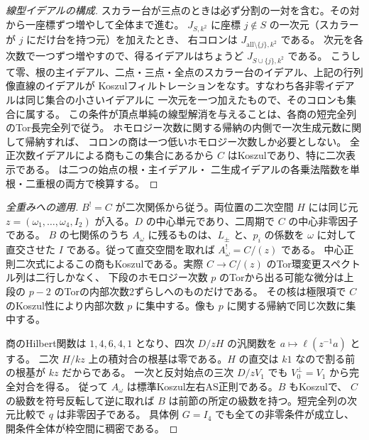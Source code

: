 \begin{proof}[線型イデアルの構成]
スカラー台が三点のときは必ず分割の一対を含む。その対から一座標ずつ増やして全体まで進む。
$J_{S,k^2}$ に座標 $j\notin S$ の一次元（スカラーが $j$ にだけ台を持つ元）を加えたとき、
右コロンは $J_{\mathrm{all}\setminus\{j\},k^2}$ である。
次元を各次数で一つずつ増やすので、得るイデアルはちょうど $J_{S\cup\{j\},k^2}$ である。
こうして零、根の主イデアル、二点・三点・全点のスカラー台のイデアル、上記の行列像直線のイデアルが
Koszulフィルトレーションをなす。すなわち各非零イデアルは同じ集合の小さいイデアルに
一次元を一つ加えたもので、そのコロンも集合に属する。
この条件が頂点単純の線型解消を与えることは、各商の短完全列のTor長完全列で従う。
ホモロジー次数に関する帰納の内側で一次生成元数に関して帰納すれば、
コロンの商は一つ低いホモロジー次数しか必要としない。
全正次数イデアルによる商もこの集合にあるから $C$ はKoszulであり、特に二次表示である。
 は二つの始点の根・主イデアル・
二生成イデアルの各乗法階数を単根・二重根の両方で検算する。
\end{proof}

\begin{proof}[全重みへの適用]
$B^!=C$ が二次関係から従う。両位置の二次空間 $H$ には同じ元
$z=(\omega_1,\ldots,\omega_4,I_2)$ が入る。$D$ の中心単元であり、二周期で $C$ の中心非零因子である。
$B$ の七関係のうち $A_\omega$ に残るものは、$L_\pm$ と、$p_i$ の係数を $\omega$ に対して
直交させた $I$ である。従って直交空間を取れば $A_\omega^!=C/(z)$ である。
中心正則二次式によるこの商もKoszulである。実際 $C\to C/(z)$ のTor環変更スペクトル列は二行しかなく、
下段のホモロジー次数 $p$ のTorから出る可能な微分は上段の $p-2$ のTorの内部次数2ずらしへのものだけである。
その核は極限項で $C$ のKoszul性により内部次数 $p$ に集中する。像も $p$ に関する帰納で同じ次数に集中する。

商のHilbert関数は $1,4,6,4,1$ となり、四次 $D/zH$ の汎関数を $a\mapsto\ell(z^{-1}a)$ とする。
二次 $H/kz$ 上の積対合の根基は零である。$H$ の直交は $k1$ なので割る前の根基が $kz$ だからである。
一次と反対始点の三次 $D/zV_1$ でも $V_0^\perp=V_1$ から完全対合を得る。
従って $A_\omega$ は標準Koszul左右AS正則である。$B$ もKoszulで、
$C$ の級数を符号反転して逆に取れば $B$ は前節の所定の級数を持つ。短完全列の次元比較で $q$ は非零因子である。
具体例 $G=I_4$ でも全ての非零条件が成立し、開条件全体が枠空間に稠密である。
\end{proof}
